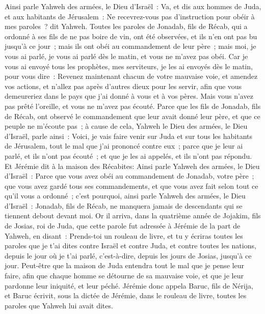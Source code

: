 \begin{multicols}{2}
Ainsi parle Yahweh des armées, le Dieu d'Israël~: Va, et dis aux hommes de Juda, et aux habitants de Jérusalem~: Ne recevrez-vous pas d'instruction pour obéir à mes paroles~? dit Yahweh.
Toutes les paroles de Jonadab, fils de Récab, qui a ordonné à ses fils de ne pas boire de vin, ont été observées, et ils n'en ont pas bu jusqu'à ce jour~; mais ils ont obéi au commandement de leur père~; mais moi, je vous ai parlé, je vous ai parlé dès le matin, et vous ne m'avez pas obéi.
Car je vous ai envoyé tous les prophètes, mes serviteurs, je les ai envoyés dès le matin, pour vous dire~: Revenez maintenant chacun de votre mauvaise voie, et amendez vos actions, et n'allez pas après d'autres dieux pour les servir, afin que vous demeureriez dans le pays que j'ai donné à vous et à vos pères. Mais vous n'avez pas prêté l'oreille, et vous ne m'avez pas écouté.
Parce que les fils de Jonadab, fils de Récab, ont observé le commandement que leur avait donné leur père, et que ce peuple ne m'écoute pas~;
à cause de cela, Yahweh le Dieu des armées, le Dieu d'Israël, parle ainsi~: Voici, je vais faire venir sur Juda et sur tous les habitants de Jérusalem, tout le mal que j'ai prononcé contre eux~; parce que je leur ai parlé, et ils n'ont pas écouté~; et que je les ai appelés, et ils n'ont pas répondu.
Et Jérémie dit à la maison des Récabites: Ainsi parle Yahweh des armées, le Dieu d'Israël~: Parce que vous avez obéi au commandement de Jonadab, votre père~; que vous avez gardé tous ses commandements, et que vous avez fait selon tout ce qu'il vous a ordonné~;
c'est pourquoi, ainsi parle Yahweh des armées, le Dieu d'Israël~: Jonadab, fils de Récab, ne manquera jamais de descendants qui se tiennent debout devant moi.
\VerseOne{}Or il arriva, dans la quatrième année de Jojakim, fils de Josias, roi de Juda, que cette parole fut adressée à Jérémie de la part de Yahweh, en disant~:
Prends-toi un rouleau de livre, et tu y écriras toutes les paroles que je t'ai dites contre Israël et contre Juda, et contre toutes les nations, depuis le jour où je t'ai parlé, c'est-à-dire, depuis les jours de Josias, jusqu'à ce jour.
Peut-être que la maison de Juda entendra tout le mal que je pense leur faire, afin que chaque homme se détourne de sa mauvaise voie, et que je leur pardonne leur iniquité, et leur péché.
Jérémie donc appela Baruc, fils de Nérija, et Baruc écrivit, sous la dictée de Jérémie, dans le rouleau de livre, toutes les paroles que Yahweh lui avait dites.

\end{multicols}

